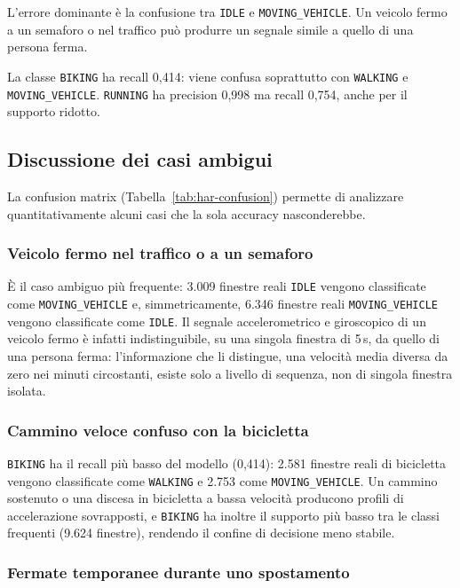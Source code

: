 \documentclass[conference]{IEEEtran}
\begin{document}
L'errore dominante è la confusione tra \texttt{IDLE} e
\texttt{MOVING\_VEHICLE}. Un veicolo fermo a un semaforo o nel traffico
può produrre un segnale simile a quello di una persona ferma.

La classe \texttt{BIKING} ha recall 0,414: viene confusa soprattutto
con \texttt{WALKING} e \texttt{MOVING\_VEHICLE}. \texttt{RUNNING} ha
precision 0,998 ma recall 0,754, anche per il supporto ridotto.

\subsection{Discussione dei casi ambigui}
\label{sec:har-ambiguous}

La confusion matrix (Tabella~\ref{tab:har-confusion}) permette di
analizzare quantitativamente alcuni casi che la sola accuracy
nasconderebbe.

\subsubsection{Veicolo fermo nel traffico o a un semaforo}

È il caso ambiguo
più frequente: 3.009 finestre reali \texttt{IDLE} vengono classificate
come \texttt{MOVING\_VEHICLE} e, simmetricamente, 6.346 finestre reali
\texttt{MOVING\_VEHICLE} vengono classificate come \texttt{IDLE}. Il
segnale accelerometrico e giroscopico di un veicolo fermo è infatti
indistinguibile, su una singola finestra di 5\,s, da quello di una
persona ferma: l'informazione che li distingue, una velocità media
diversa da zero nei minuti circostanti, esiste solo a livello di
sequenza, non di singola finestra isolata.

\subsubsection{Cammino veloce confuso con la bicicletta}

\texttt{BIKING} ha
il recall più basso del modello (0,414): 2.581 finestre reali di
bicicletta vengono classificate come \texttt{WALKING} e 2.753 come
\texttt{MOVING\_VEHICLE}. Un cammino sostenuto o una discesa in
bicicletta a bassa velocità producono profili di accelerazione
sovrapposti, e \texttt{BIKING} ha inoltre il supporto più basso tra le
classi frequenti (9.624 finestre), rendendo il confine di decisione
meno stabile.

\subsubsection{Fermate temporanee durante uno spostamento}
\end{document}
